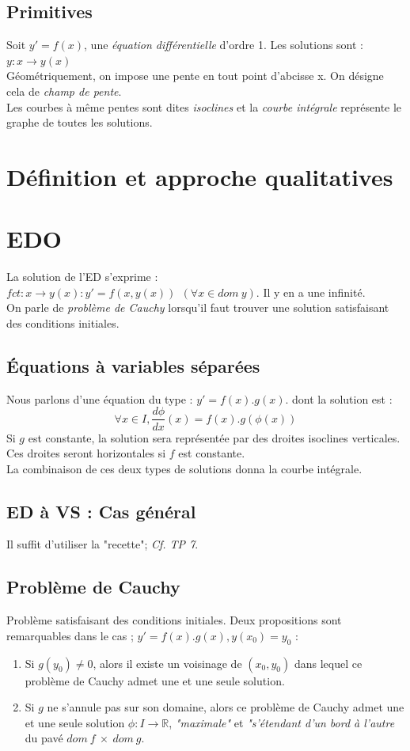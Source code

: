 \documentclass[11pt, a4paper, openany]{book}
\begin{document}
\subsection{Primitives}
Soit $y' = f(x)$, une \textit{équation différentielle} d'ordre 1. Les solutions sont : $y : x \rightarrow y(x)$\\
Géométriquement, on impose une pente en tout point d'abcisse x. On désigne cela de \textit{champ de pente}.\\
Les courbes à même pentes sont dites \textit{isoclines} et la \textit{courbe intégrale} représente le graphe de toutes les solutions.

\section{Définition et approche qualitatives}
\section{EDO}
La solution de l'ED s'exprime : $fct : x \rightarrow y(x) : y' = f(x, y(x))\ \ (\forall x \in dom\ y)$. Il y en a une infinité.\\
On parle de \textit{problème de Cauchy} lorsqu'il faut trouver une solution satisfaisant des conditions initiales.

\subsection{Équations à variables séparées}
Nous parlons d'une équation du type : $y' = f(x).g(x)$. dont la solution est : $$\forall x \in I, \frac{d \phi}{dx}(x) = f(x).g(\phi (x))$$
Si $g$ est constante, la solution sera représentée par des droites isoclines verticales. Ces droites seront horizontales si $f$ est constante.\\
La combinaison de ces deux types de solutions donna la courbe intégrale. 

\subsection{ED à VS : Cas général}
Il suffit d'utiliser la "recette"; \textit{Cf. TP 7}.

\subsection{Problème de Cauchy}
Problème satisfaisant des conditions initiales. Deux propositions sont remarquables dans le cas ; $y' = f(x).g(x), y(x_0) = y_0$ :
\begin{enumerate}
	\item Si $g(y_0) \neq 0$, alors il existe un voisinage de $(x_0,y_0)$ dans lequel ce problème de Cauchy admet une et une seule solution.
	\item Si $g$ ne s'annule pas sur son domaine, alors ce problème de Cauchy admet une et une seule solution $\phi : I \rightarrow \mathbb{R}$, \textit{"maximale"} et \textit{"s'étendant d'un bord à l'autre} du pavé $dom\ f\ \times\ dom\ g$.
\end{enumerate}
\end{document}
